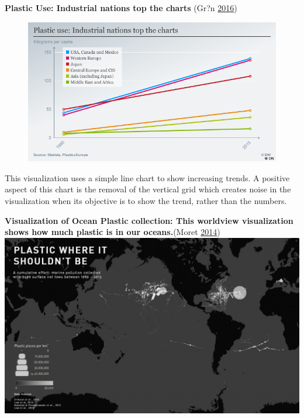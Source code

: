 \documentclass[]{book}
\begin{document}
\textbf{Plastic Use: Industrial nations top the charts} (Gr?n
\protect\hyperlink{ref-plastic_pollution_visualizations}{2016})

\begin{figure}
\centering
\includegraphics{images/plastic_use.png}
\caption{}
\end{figure}

This visualization uses a simple line chart to show increasing trends. A
positive aspect of this chart is the removal of the vertical grid which
creates noise in the visualization when its objective is to show the
trend, rather than the numbers.

\textbf{Visualization of Ocean Plastic collection: This worldview
visualization shows how much plastic is in our oceans.}(Moret
\protect\hyperlink{ref-ocean_plastic_pollution}{2014})
\includegraphics{images/Ocean_Plasticpollution.jpg}
\end{document}
